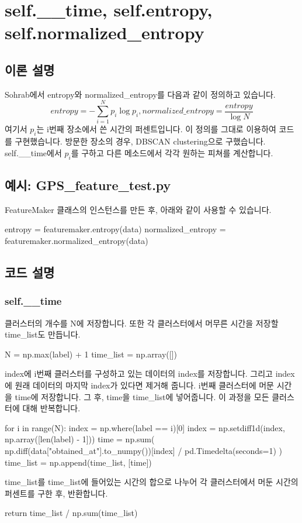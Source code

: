 \documentclass{oblivoir}
\begin{document}
  \section{self.\_\_time, self.entropy, self.normalized\_entropy}
  \subsection{이론 설명}
  Sohrab\cite{Sohrab}에서 entropy와 normalized\_entropy를 다음과 같이 정의하고 있습니다.
  \[entropy=-\sum_{i=1}^N{p_i\log p_i},normalized\_entropy=\frac{entropy}{\log N}\]
  여기서 $p_i$는 i번째 장소에서 쓴 시간의 퍼센트입니다.
  이 정의를 그대로 이용하여 코드를 구현했습니다.
  방문한 장소의 경우, DBSCAN clustering으로 구했습니다.
  self.\_\_time에서 $p_i$를 구하고 다른 메소드에서 각각 원하는 피쳐를 계산합니다.

  \subsection{예시: GPS\_feature\_test.py}
  FeatureMaker 클래스의 인스턴스를 만든 후, 아래와 같이 사용할 수 있습니다.
  \begin{python}[label={GPS_feature_17}]
    entropy = featuremaker.entropy(data)
    normalized_entropy = featuremaker.normalized_entropy(data)
  \end{python}

  \subsection{코드 설명}
  \subsubsection{self.\_\_time}
  클러스터의 개수를 N에 저장합니다. 또한 각 클러스터에서 머무른 시간을 저장할 time\_list도 만듭니다.
  \begin{python}[label={GPS_feature_18}]
    N = np.max(label) + 1
    time_list = np.array([])
  \end{python}
  index에 i번째 클러스터를 구성하고 있는 데이터의 index를 저장합니다.
  그리고 index에 원래 데이터의 마지막 index가 있다면 제거해 줍니다.
  i번째 클러스터에 머문 시간을 time에 저장합니다. 그 후, time을 time\_list에 넣어줍니다.
  이 과정을 모든 클러스터에 대해 반복합니다.
  \begin{python}[label={GPS_feature_19}]
    for i in range(N):
      index = np.where(label == i)[0]
      index = np.setdiff1d(index, np.array([len(label) - 1]))
      time = np.sum(
          np.diff(data["obtained_at"].to_numpy())[index] / pd.Timedelta(seconds=1)
      )
      time_list = np.append(time_list, [time])
  \end{python}
  time\_list를 time\_list에 들어있는 시간의 합으로 나누어 각 클러스터에서 머둔 시간의 퍼센트를 구한 후, 반환합니다.
  \begin{python}[label={GPS_feature_20}]
    return time_list / np.sum(time_list)
  \end{python}
\end{document}
